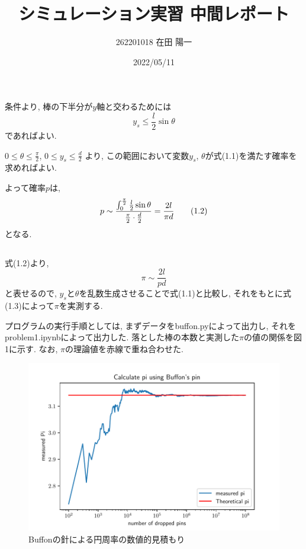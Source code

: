 \documentclass[a4paper,dvipdfmx]{jarticle}
\begin{document}
\title{シミュレーション実習 中間レポート}
\author{262201018 在田 陽一}
\date{2022/05/11}
\maketitle


\section{}
\subsection{}
\noindent

条件より, 棒の下半分が$y$軸と交わるためには
\begin{equation}
     y_s \leq \frac{l}{2}\sin\theta \tag{1.1}
\end{equation}
であればよい.

\noindent
$0 \leq \theta \leq \frac{\pi}{2}$, $0 \leq y_s \leq \frac{d}{2}$ より,
この範囲において変数$y_s$, $\theta$が式(1.1)を満たす確率を求めればよい.

\noindent
よって確率$p$は,
\begin{equation}
    p \sim \frac{\int^\frac{\pi}{2}_0 \frac{l}{2}\sin \theta}{\frac{\pi}{2} \cdot \frac{d}{2}} \\
     =\frac{2l}{\pi d} \tag{1.2}
\end{equation}
となる.

\subsection{}

\noindent
式(1.2)より,
\begin{equation}
   \pi \sim  \frac{2l}{pd} \tag{1.3}
\end{equation}
と表せるので, $y_s$と$\theta$を乱数生成させることで式(1.1)と比較し,
それをもとに式(1.3)によって$\pi$を実測する.

\noindent
プログラムの実行手順としては, まずデータをbuffon.pyによって出力し,
それをproblem1.ipynbによって出力した. 
落とした棒の本数と実測した$\pi$の値の関係を図1に示す. なお, $\pi$の理論値を赤線で重ね合わせた.
\begin{figure}[H]
    \centering
    \includegraphics[scale=0.6]{./problem_1/problem1-2.pdf}
    \caption{Buffonの針による円周率の数値的見積もり}
\end{figure}
\end{document}
